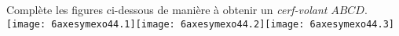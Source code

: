 Complète les figures ci-dessous de manière à obtenir un {\em
    cerf-volant} $ABCD$.
\\\texttt{[image: 6axesymexo44.1]}\hfill\texttt{[image: 6axesymexo44.2]}\hfill\texttt{[image: 6axesymexo44.3]}